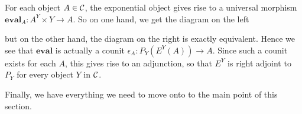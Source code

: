     \begin{prf}
        For each object $A \in \mathcal{C}$, the exponential object gives rise
        to a universal morphism $\textbf{eval}_A: A^Y \times Y \to A$.
        So on one hand, we get the diagram on the left
        \begin{center}
            \hspace{0.5cm}
            \hspace{1cm}
            \hspace{0.5cm}
        \end{center}
        but on the other hand, the diagram on the right is exactly
        equivalent. Hence we see that $\textbf{eval}$ is actually a
        counit $\epsilon_A: P_Y(E^Y(A)) \to A$. Since such a counit
        exists for each $A$, this gives rise to an adjunction, so that
        $E^Y$ is right adjoint to $P_Y$ for every object $Y$ in $\mathcal{C}$.
    \end{prf}

    Finally, we have everything we need to move onto to the main point
    of this section. 

